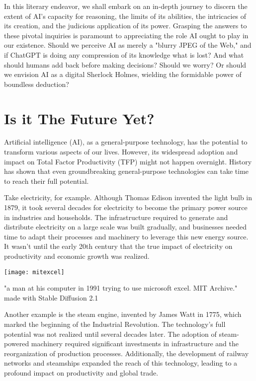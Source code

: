 In this literary endeavor, we shall embark on an in-depth journey to discern the extent of AI's capacity for reasoning, the limits of its abilities, the intricacies of its creation, and the judicious application of its power. Grasping the answers to these pivotal inquiries is paramount to appreciating the role AI ought to play in our existence. Should we perceive AI as merely a "blurry JPEG of the Web,"  and if ChatGPT is doing any compression of its knowledge what is lost? And what should humans add back before making decisions? Should we worry? Or should we envision AI as a digital Sherlock Holmes, wielding the formidable power of boundless deduction?

\section{Is it The Future Yet?}

Artificial intelligence (AI), as a general-purpose technology, has the potential to transform various aspects of our lives. However, its widespread adoption and impact on Total Factor Productivity (TFP) might not happen overnight. History has shown that even groundbreaking general-purpose technologies can take time to reach their full potential.

Take electricity, for example. Although Thomas Edison invented the light bulb in 1879, it took several decades for electricity to become the primary power source in industries and households. The infrastructure required to generate and distribute electricity on a large scale was built gradually, and businesses needed time to adapt their processes and machinery to leverage this new energy source. It wasn't until the early 20th century that the true impact of electricity on productivity and economic growth was realized.

\begin{pdf}
\begin{marginfigure}[-5.5cm]
    \texttt{[image: mitexcel]}
        \caption{"a man at his computer in 1991 trying to use microsoft excel. MIT Archive." made with Stable Diffusion 2.1}
\end{marginfigure}
\end{pdf}

Another example is the steam engine, invented by James Watt in 1775, which marked the beginning of the Industrial Revolution. The technology’s full potential was not realized until several decades later. The adoption of steam-powered machinery required significant investments in infrastructure and the reorganization of production processes. Additionally, the development of railway networks and steamships expanded the reach of this technology, leading to a profound impact on productivity and global trade.


